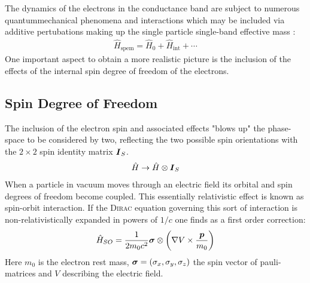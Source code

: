 The dynamics of the electrons in the conductance band are subject to numerous quantummechanical phenomena and interactions which may be included via additive pertubations making up the single particle single-band effective mass \hamil{}:
\begin{align}
\hat{H}_{\text{spem}} = \hat{H}_0 + \hat{H}_{\text{int}}+\dotsb \label{eqn:generalhamil}
\end{align}
One important aspect to obtain a more realistic picture is the inclusion of the effects of the internal spin degree of freedom of the electrons.
\subsection{Spin Degree of Freedom}
The inclusion of the electron spin and associated effects "blows up" the phase-space to be considered by two, reflecting the two possible spin orientations with the $2 \times 2$ spin identity matrix $\boldsymbol{I}_S$. 
\begin{align}
\hat{H} \rightarrow \hat{H} \otimes \boldsymbol{I}_S
\end{align}
When a particle in vacuum moves through an electric field its orbital and spin degrees of freedom become coupled. This essentially relativistic effect is known as spin-orbit interaction. If the \textsc{Dirac} equation governing this sort of interaction is non-relativistically expanded in powers of $1/c$ one finds as a first order correction\cite{Nowack2009Thesis}:
\begin{align}
\hat{H}_{SO} = \frac{1}{2m_0c^2} \boldsymbol{\sigma} \otimes \left( \nabla V \times \frac{\boldsymbol{p}}{m_0}\right)
\label{eqn:spinorbithamil}
\end{align}
Here $m_0$ is the electron rest mass, $\boldsymbol{\sigma} = (\sigma_x, \sigma_y,\sigma_z)$ the spin vector of pauli-matrices and $V$ describing the electric field. 

